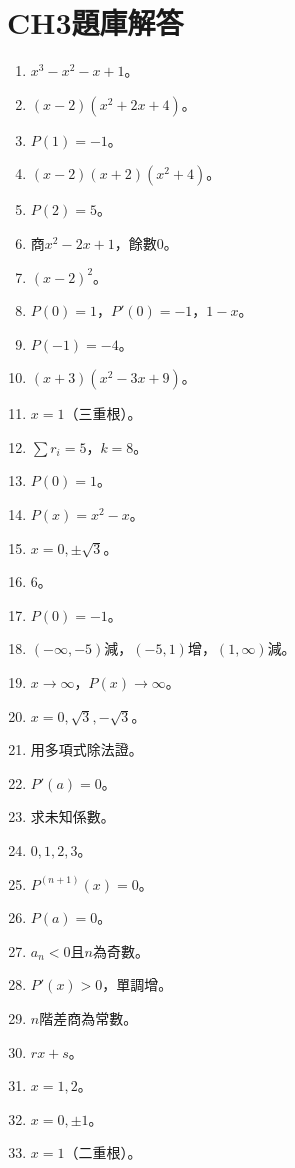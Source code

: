 \section{CH3題庫解答}
\begin{enumerate}[label=\arabic*.]
    \item $x^3 - x^2 - x + 1$。
    \item $(x - 2)(x^2 + 2x + 4)$。
    \item $P(1) = -1$。
    \item $(x - 2)(x + 2)(x^2 + 4)$。
    \item $P(2) = 5$。
    \item 商$x^2 - 2x + 1$，餘數$0$。
    \item $(x - 2)^2$。
    \item $P(0) = 1$，$P'(0) = -1$，$1 - x$。
    \item $P(-1) = -4$。
    \item $(x + 3)(x^2 - 3x + 9)$。
    \item $x = 1$（三重根）。
    \item $\sum r_i = 5$，$k = 8$。
    \item $P(0) = 1$。
    \item $P(x) = x^2 - x$。
    \item $x = 0, \pm \sqrt{3}$。
    \item $6$。
    \item $P(0) = -1$。
    \item $(-\infty, -5)$減，$(-5, 1)$增，$(1, \infty)$減。
    \item $x \to \infty$，$P(x) \to \infty$。
    \item $x = 0, \sqrt{3}, -\sqrt{3}$。
    \item 用多項式除法證。
    \item $P'(a) = 0$。
    \item 求未知係數。
    \item $0, 1, 2, 3$。
    \item $P^{(n+1)}(x) = 0$。
    \item $P(a) = 0$。
    \item $a_n < 0$且$n$為奇數。
    \item $P'(x) > 0$，單調增。
    \item $n$階差商為常數。
    \item $rx + s$。
    \item $x = 1, 2$。
    \item $x = 0, \pm 1$。
    \item $x = 1$（二重根）。

\end{enumerate}
